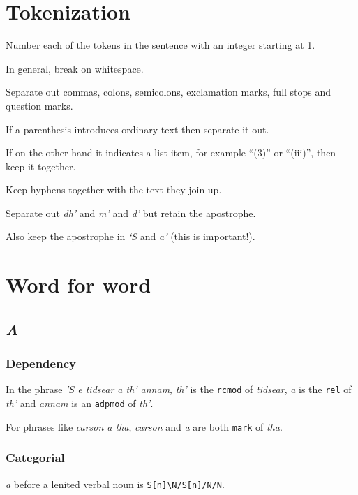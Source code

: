\documentclass[a4paper]{article}
\begin{document}
\section{Tokenization}

 Number each of the tokens in the sentence with an integer starting at 1.

 In general, break on whitespace.

 Separate out commas, colons, semicolons, exclamation marks, full stops and question marks.

 If a parenthesis introduces ordinary text then separate it out.

 If on the other hand it indicates a list item, for example ``(3)'' or ``(iii)'', then keep it together.

 Keep hyphens together with the text they join up.

 Separate out \textit{dh'} and \textit{m'} and \textit{d'} but retain the apostrophe.

 Also keep the apostrophe in \textit{`S} and \textit{a'} (this is important!).

\section{Word for word}

\subsection{\textit{A}}
\subsubsection{Dependency}

 In the phrase \textit{'S e tidsear a th' annam}, \textit{th'} is the \texttt{rcmod} of \textit{tidsear}, \textit{a} is the \texttt{rel} of \textit{th'} and \textit{annam} is an \texttt{adpmod} of \textit{th'}.

 For phrases like \textit{carson a tha}, \textit{carson} and \textit{a} are both \texttt{mark} of \textit{tha}.

\subsubsection{Categorial}

 \textit{a} before a lenited verbal noun is \texttt{S[n]\textbackslash N/S[n]/N/N}.
\end{document}
